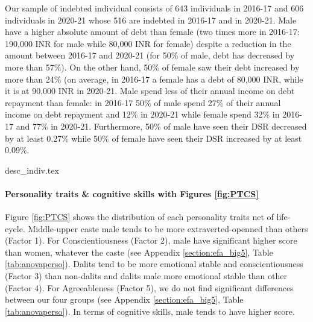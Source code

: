 \documentclass[a4paper, 11pt, onecolumn]{article}
\begin{document}
Our sample of indebted individual consists of 643 individuals in 2016-17 and 606 individuals in 2020-21 whose 516 are indebted in 2016-17 and in 2020-21.
Male have a higher absolute amount of debt than female (two times more in 2016-17: 190,000 INR for male while 80,000 INR for female) despite a reduction in the amount between 2016-17 and 2020-21 (for 50\% of male, debt has decreased by more than 57\%).
On the other hand, 50\% of female saw their debt increased by more than 24\% (on average, in 2016-17 a female has a debt of 80,000 INR, while it is at 90,000 INR in 2020-21.
Male spend less of their annual income on debt repayment than female: in 2016-17 50\% of male spend 27\% of their annual income on debt repayment and 12\% in 2020-21 while female spend 32\% in 2016-17 and 77\% in 2020-21.
Furthermore, 50\% of male have seen their DSR decreased by at least 0.27\% while 50\% of female have seen their DSR increased by at least 0.09\%.


{desc_indiv.tex}

\paragraph{Personality traits \& cognitive skills with Figures \ref{fig:PTCS}}

Figure \ref{fig:PTCS} shows the distribution of each personality traits net of life-cycle.
Middle-upper caste male tends to be more extraverted-openned than others (Factor 1).
For Conscientiousness (Factor 2), male have significant higher score than women, whatever the caste (see Appendix \ref{section:efa_big5}, Table \ref{tab:anovaperso}).
Dalits tend to be more emotional stable and conscientiousness (Factor 3) than non-dalits
and dalits male more emotional stable than other (Factor 4).
For Agreeableness (Factor 5), we do not find significant differences between our four groups (see Appendix \ref{section:efa_big5}, Table \ref{tab:anovaperso}).
In terms of cognitive skills, male tends to have higher score.
\end{document}
